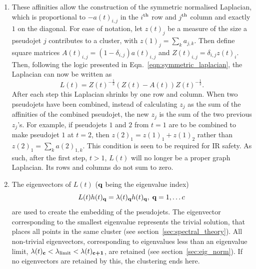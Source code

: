 \begin{enumerate}
\item\label{step:laplacean} These affinities allow the construction of the symmetric normalised
        Laplacian, which is proportional to \(-a(t)_{i, j}\)
        in the \(i\)$^{\rm th}$ row and \(j\)$^{\rm th}$ column and exactly \(1\) on the diagonal.
        For ease of notation, let \(z(t)_j\) be a measure of the size a pseudojet \(j\) contributes to a cluster,
        with \(z(1)_j = \sum_k a_{j,k}\).
        Then define square matrices \(A(t)_{i, j} = (1 - \delta_{i, j}) a(t)_{i, j}\) and \(Z(t)_{i, j} = \delta_{i, j} z(t)_i\).
        Then, following the logic presented in Eqn.~\ref{eqn:symmetric_laplacian}, the Laplacian can now be written as
       \begin{equation}\label{eqn:Laplacian}
           L(t) = Z(t)^{-\frac{1}{2}}(Z(t) - A(t))Z(t)^{-\frac{1}{2}}.
       \end{equation}
        After each step this Laplacian shrinks by one row and column.
        When two pseudojets have been combined, instead of calculating \(z_j\) as the sum of the affinities of the combined pseudojet,
        the new \(z_j\) is the sum of the two previous \(z_j\)'s.
        For example, if pseudojets \(1\) and \(2\) from \(t=1\) are to be combined to make pseudojet \(1\) at \(t=2\),
        then \(z(2)_{1} = z(1)_1 + z(1)_2\) rather than \(z(2)_{1} = \sum_k a(2)_{1, k} \).
        This condition is seen to be required for IR safety. 
        As such, after the first step, \(t > 1\),
        \(L(t)\) will no longer be a proper graph Laplacian.
        Its rows and columns do not sum to zero.

    \item \label{step:eigenvectors} The eigenvectors of \(L(t)\) (\(\textbf{q}\) being the eigenvalue index)
            \begin{equation}
                L(t) h(t)_{\textbf{q}} = \lambda(t)_{\textbf{q}} h(t)_{\textbf{q}},  \; \textbf{q}=1, \ldots c
            \end{equation}
            	are used to create the embedding of the pseudojets.
            The eigenvector corresponding to the smallest eigenvalue represents the trivial solution,
            that places all points in the same cluster (see section~\ref{sec:spectral_theory}).
            All non-trivial eigenvectors, corresponding
            to eigenvalues less than an eigenvalue limit, \(\lambda(t)_{\textbf{c}} < \lambda_\text{limit} < \lambda(t)_{\textbf{c+1}}\),
            are retained (see section~\ref{sec:eig_norm}).
            If no eigenvectors are retained by this, the clustering ends here.


\end{enumerate}
